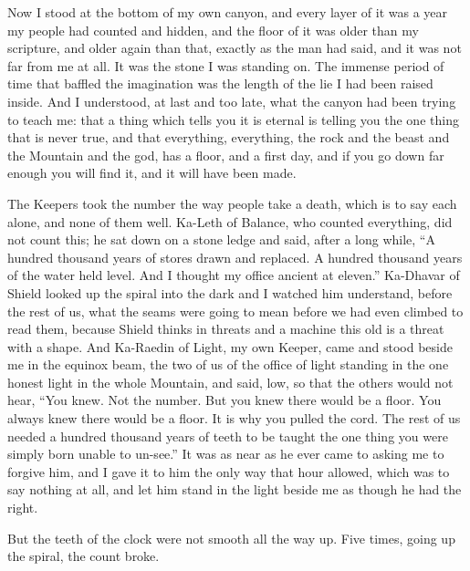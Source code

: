 Now I stood at the bottom of my own canyon, and every layer of it was a year my people had counted and hidden, and the floor of it was older than my scripture, and older again than that, exactly as the man had said, and it was not far from me at all. It was the stone I was standing on. The immense period of time that baffled the imagination was the length of the lie I had been raised inside. And I understood, at last and too late, what the canyon had been trying to teach me: that a thing which tells you it is eternal is telling you the one thing that is never true, and that everything, everything, the rock and the beast and the Mountain and the god, has a floor, and a first day, and if you go down far enough you will find it, and it will have been made.\par

The Keepers took the number the way people take a death, which is to say each alone, and none of them well. Ka-Leth of Balance, who counted everything, did not count this; he sat down on a stone ledge and said, after a long while, ``A hundred thousand years of stores drawn and replaced. A hundred thousand years of the water held level. And I thought my office ancient at eleven.'' Ka-Dhavar of Shield looked up the spiral into the dark and I watched him understand, before the rest of us, what the seams were going to mean before we had even climbed to read them, because Shield thinks in threats and a machine this old is a threat with a shape. And Ka-Raedin of Light, my own Keeper, came and stood beside me in the equinox beam, the two of us of the office of light standing in the one honest light in the whole Mountain, and said, low, so that the others would not hear, ``You knew. Not the number. But you knew there would be a floor. You always knew there would be a floor. It is why you pulled the cord. The rest of us needed a hundred thousand years of teeth to be taught the one thing you were simply born unable to un-see.'' It was as near as he ever came to asking me to forgive him, and I gave it to him the only way that hour allowed, which was to say nothing at all, and let him stand in the light beside me as though he had the right.\par

\ornament

But the teeth of the clock were not smooth all the way up. Five times, going up the spiral, the count broke.\par

